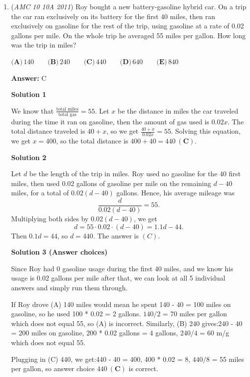 \begin{enumerate}
	\item (\textit{AMC 10 10A 2011}) Roy bought a new battery-gasoline hybrid car. On a trip the car ran exclusively on its battery for the first 40 miles, then ran exclusively on gasoline for the rest of the trip, using gasoline at a rate of 0.02 gallons per mile. On the whole trip he averaged 55 miles per gallon. How long was the trip in miles?


 $\textbf{(A)}\,140 \qquad\textbf{(B)}\,240 \qquad\textbf{(C)}\,440 \qquad\textbf{(D)}\,640 \qquad\textbf{(E)}\,840$

 \textbf{Answer: }C



\textbf{Solution 1}

We know that $\frac{\text{total miles}}{\text{total gas}}=55$. Let $x$ be the distance in miles the car traveled during the time it ran on gasoline, then the amount of gas used is $0.02x$. The total distance traveled is $40+x$, so we get $\frac{40+x}{0.02x}=55$. Solving this equation, we get $x=400$, so the total distance is $400 + 40 = \boxed{440 \ \mathbf{(C)}}$.

 



\textbf{Solution 2}

Let $d$ be the length of the trip in miles. Roy used no gasoline for the 40 first miles, then used 0.02 gallons of gasoline per mile on the remaining $d - 40$ miles, for a total of $0.02 (d - 40)$ gallons. Hence, his average mileage was
 \[\frac{d}{0.02 (d - 40)} = 55.\]Multiplying both sides by $0.02 (d - 40)$, we get
 \[d = 55 \cdot 0.02 \cdot (d - 40) = 1.1d - 44.\]Then $0.1d = 44$, so $d = \boxed{440}$. The answer is $(C)$.

 


 



\textbf{Solution 3 (Answer choices)}

Since Roy had 0 gasoline usage during the first 40 miles, and we know his usage is 0.02 gallons per mile after that, we can look at all 5 individual answers and simply run them through.

 If Roy drove (A) 140 miles would mean he spent 140 - 40 = 100 miles on gasoline, so he used 100 * 0.02 = 2 gallons. $140/2$ = 70 miles per gallon which does not equal 55, so (A) is incorrect. Similarly, (B) 240 gives:240 - 40 = 200 miles on gasoline, 200 * 0.02 gallons = 4 gallons, $240/4$ = 60 m/g which does not equal 55.

 Plugging in (C) 440, we get:440 - 40 = 400, 400 * 0.02 = 8, $440/8$ = 55 miles per gallon, so answer choice $\boxed{440 \ \mathbf{(C)}}$ is correct.


\end{enumerate}
